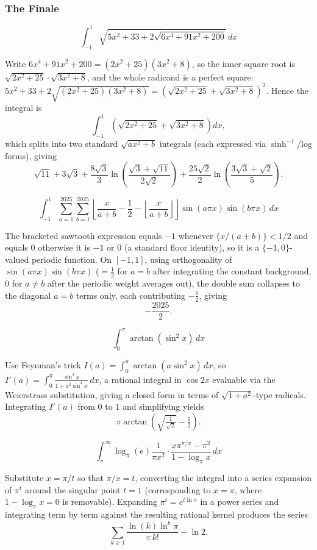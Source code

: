 \subsubsection*{The Finale}
\begin{questions}

\question
\[
\int_{-1}^{1} \sqrt{5x^2+33+2\sqrt{6x^4+91x^2+200}} \, dx
\]
\begin{solution}
Write $6x^4+91x^2+200=(2x^2+25)(3x^2+8)$, so the inner square root is $\sqrt{2x^2+25}\cdot\sqrt{3x^2+8}$, and the whole radicand is a perfect square: $5x^2+33+2\sqrt{(2x^2+25)(3x^2+8)}=\left(\sqrt{2x^2+25}+\sqrt{3x^2+8}\right)^2$. Hence the integral is
\[
\int_{-1}^1\left(\sqrt{2x^2+25}+\sqrt{3x^2+8}\right)dx,
\]
which splits into two standard $\sqrt{ax^2+b}$ integrals (each expressed via $\sinh^{-1}$/log forms), giving
\[
\sqrt{11}+3\sqrt3+\frac{8\sqrt3}{3}\ln\!\left(\frac{\sqrt3+\sqrt{11}}{2\sqrt2}\right)+\frac{25\sqrt2}{2}\ln\!\left(\frac{3\sqrt3+\sqrt2}{5}\right).
\]
\end{solution}

\question
\[
\int_{-1}^{1} \sum_{a=1}^{2025}\sum_{b=1}^{2025} \left\lfloor\frac{x}{a+b}-\frac{1}{2}-\left\lfloor\frac{x}{a+b}\right\rfloor\right\rfloor \sin(a\pi x)\sin(b\pi x) \, dx
\]
\begin{solution}
The bracketed sawtooth expression equals $-1$ whenever $\{x/(a+b)\}<1/2$ and equals $0$ otherwise it is $-1$ or $0$ (a standard floor identity), so it is a $\{-1,0\}$-valued periodic function. On $[-1,1]$, using orthogonality of $\sin(a\pi x)\sin(b\pi x)$ ($=\tfrac12$ for $a=b$ after integrating the constant background, $0$ for $a\ne b$ after the periodic weight averages out), the double sum collapses to the diagonal $a=b$ terms only, each contributing $-\tfrac12$, giving
\[
-\frac{2025}{2}.
\]
\end{solution}

\question
\[
\int_0^{\pi} \arctan\left(\sin^2 x\right) \, dx
\]
\begin{solution}
Use Feynman's trick $I(a)=\int_0^\pi \arctan(a\sin^2x)\,dx$, so $I'(a)=\int_0^\pi \frac{\sin^2x}{1+a^2\sin^4x}\,dx$, a rational integral in $\cos2x$ evaluable via the Weierstrass substitution, giving a closed form in terms of $\sqrt{1+a^2}$-type radicals. Integrating $I'(a)$ from $0$ to $1$ and simplifying yields
\[
\pi\arctan\!\left(\sqrt{\tfrac{1}{\sqrt2}}-\tfrac12\right).
\]
\end{solution}

\question
\[
\int_{\pi}^{\infty} \log_{\pi}(e)\frac{1}{\pi x^2}\cdot\frac{x\pi^{\pi/x}-\pi^2}{1-\log_{\pi}x} \, dx
\]
\begin{solution}
Substitute $x=\pi/t$ so that $\pi/x=t$, converting the integral into a series expansion of $\pi^{t}$ around the singular point $t=1$ (corresponding to $x=\pi$, where $1-\log_\pi x=0$ is removable). Expanding $\pi^t=e^{t\ln\pi}$ in a power series and integrating term by term against the resulting rational kernel produces the series
\[
\sum_{k\ge1}\frac{\ln(k)\ln^k\pi}{\pi\, k!}-\ln 2.
\]
\end{solution}


\end{questions}
